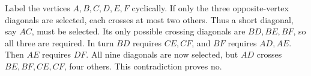Label the vertices $A,B,C,D,E,F$ cyclically. If only the three opposite-vertex diagonals are selected, each crosses at most two others. Thus a short diagonal, say $AC$, must be selected. Its only possible crossing diagonals are $BD,BE,BF$, so all three are required. In turn $BD$ requires $CE,CF$, and $BF$ requires $AD,AE$. Then $AE$ requires $DF$. All nine diagonals are now selected, but $AD$ crosses $BE,BF,CE,CF$, four others. This contradiction proves $\boxed{\text{no}}$.

